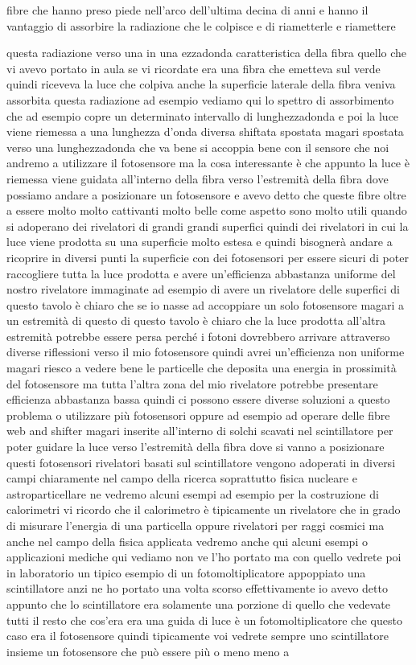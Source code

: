 fibre che hanno preso piede nell'arco dell'ultima decina di anni e hanno il vantaggio di assorbire la radiazione che le colpisce e di riametterle e riamettere

questa radiazione verso una in una ezzadonda caratteristica della fibra quello che vi avevo portato in aula se vi ricordate era una fibra che emetteva sul verde quindi riceveva la luce che colpiva anche la superficie laterale della fibra veniva assorbita questa radiazione ad esempio vediamo qui lo spettro di assorbimento che ad esempio copre un determinato intervallo di lunghezzadonda e poi la luce viene riemessa a una lunghezza d'onda diversa shiftata spostata magari spostata verso una lunghezzadonda che va bene si accoppia bene con il sensore che noi andremo a utilizzare il fotosensore ma la cosa interessante è che appunto la luce è riemessa viene guidata all'interno della fibra verso l'estremità della fibra dove possiamo andare a posizionare un fotosensore e avevo detto che queste fibre oltre a essere molto molto cattivanti molto belle come aspetto sono molto utili quando si adoperano dei rivelatori di grandi grandi superfici quindi dei rivelatori in cui la luce viene prodotta su una superficie molto estesa e quindi bisognerà andare a ricoprire in diversi punti la superficie con dei fotosensori per essere sicuri di poter raccogliere tutta la luce prodotta e avere un'efficienza abbastanza uniforme del nostro rivelatore immaginate ad esempio di avere un rivelatore delle superfici di questo tavolo è chiaro che se io nasse ad accoppiare un solo fotosensore magari a un estremità di questo di questo tavolo è chiaro che la luce prodotta all'altra estremità potrebbe essere persa perché i fotoni dovrebbero arrivare attraverso diverse riflessioni verso il mio fotosensore quindi avrei un'efficienza non uniforme magari riesco a vedere bene le particelle che deposita una energia in prossimità del fotosensore ma tutta l'altra zona del mio rivelatore potrebbe presentare efficienza abbastanza bassa quindi ci possono essere diverse soluzioni a questo problema o utilizzare più fotosensori oppure ad esempio ad operare delle fibre web and shifter magari inserite all'interno di solchi scavati nel scintillatore per poter guidare la luce verso l'estremità della fibra dove si vanno a posizionare questi fotosensori rivelatori basati sul scintillatore vengono adoperati in diversi campi chiaramente nel campo della ricerca soprattutto fisica nucleare e astroparticellare ne vedremo alcuni esempi ad esempio per la costruzione di calorimetri vi ricordo che il calorimetro è tipicamente un rivelatore che in grado di misurare l'energia di una particella oppure rivelatori per raggi cosmici ma anche nel campo della fisica applicata vedremo anche qui alcuni esempi o applicazioni mediche qui vediamo non ve l'ho portato ma con quello vedrete poi in laboratorio un tipico esempio di un fotomoltiplicatore appoppiato una scintillatore anzi ne ho portato una volta scorso effettivamente io avevo detto appunto che lo scintillatore era solamente una porzione di quello che vedevate tutti il resto che cos'era era una guida di luce è un fotomoltiplicatore che questo caso era il fotosensore quindi tipicamente voi vedrete sempre uno scintillatore insieme un fotosensore che può essere più o meno meno a 